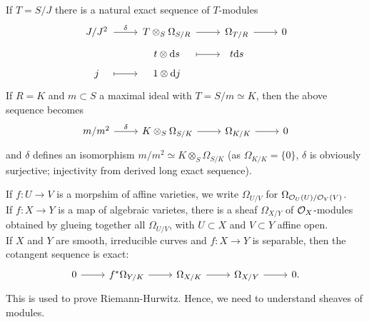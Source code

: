 \documentclass[a4paper,11pt]{article}
\begin{document}
				\begin{prop}\label{prop--conormal-sequence}
					If $T=S/J$ there is a natural exact sequence of $T$-modules 
					\begin{equation*}
						\begin{tikzcd}[row sep=tiny,
							/tikz/column 1/.append style={nodes={text width=2.5em, text centered}},
							/tikz/column 2/.append style={nodes={text width=5em, text centered}},
							/tikz/column 3/.append style={nodes={text width=2.5em, text centered}}]
							J/J^2\ar[r,"\delta"] & T\otimes_S\Omega_{S/R}\ar[r] & \Omega_{T/R}\ar[r] & 0\\
							& t\otimes\mathrm{d}s \ar[r,mapsto] & t\mathrm{d}s &\\
							j\ar[r,mapsto] & 1\otimes \mathrm{d}j & &
						\end{tikzcd}
					\end{equation*}
					If $R=K$ and $m\subset S$ a maximal ideal with $T=S/m\simeq K$, then the above sequence becomes 
					\begin{equation*}
						\begin{tikzcd}
							m/m^2\ar[r,"\delta"] & K\otimes_S\Omega_{S/K}\ar[r] & \Omega_{K/K}\ar[r] & 0
						\end{tikzcd}
					\end{equation*}
					and $\delta$ defines an isomorphism $m/m^2\simeq K\otimes_S\Omega_{S/K}$ (as $\Omega_{K/K}=\{0\}$, $\delta$ is obviously surjective; injectivity from derived long exact sequence).
				\end{prop}

				If $f:U\rightarrow V$ is a morpshim of affine varieties, we write $\Omega_{U/V}$ for $\Omega_{\mathcal{O}_U(U)/\mathcal{O}_V(V)}$.
				\\

				\noindent If $f:X\rightarrow Y$ is a map of algebraic varietes, there is a sheaf $\Omega_{X/Y}$ of $\mathcal{O}_X$-modules obtained by glueing together all $\Omega_{U/V}$, with $U\subset X$ and $V\subset Y$ affine open.
				\\

				\noindent If $X$ and $Y$ are smooth, irreducible curves and $f:X\rightarrow Y$ is separable, then the cotangent sequence is exact:
				\begin{equation*}
					\begin{tikzcd}
						0\ar[r] & f^\ast\Omega_{Y/K}\ar[r] & \Omega_{X/K}\ar[r] & \Omega_{X/Y}\ar[r] & 0.
					\end{tikzcd}
				\end{equation*}
				This is used to prove Riemann-Hurwitz. Hence, we need to understand sheaves of modules.
\end{document}
